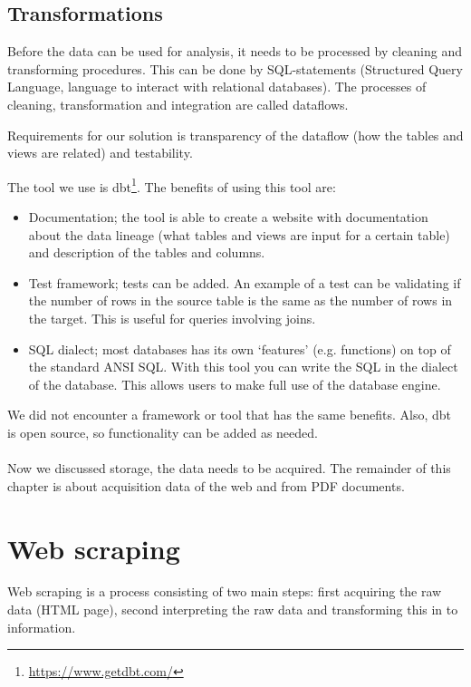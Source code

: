 \documentclass{ou-report}
\begin{document}
\subsection{Transformations}
\label{gen_impl:dbt}
Before the data can be used for analysis, it needs to be processed by cleaning
and transforming procedures. This can be done by SQL-statements (Structured Query 
Language, language to interact with relational databases). The processes of 
cleaning, transformation and integration are called dataflows.

Requirements for our solution is transparency of the dataflow (how the
tables and views are related) and testability.

The tool we use is dbt\footnote{\url{https://www.getdbt.com/}}. The benefits of
using this tool are:
\begin{itemize}
    \item Documentation; the tool is able to create a website with documentation
    about the data lineage (what tables and views are input for a certain table) 
    and description of the tables and columns.
    \item Test framework; tests can be added. An example of a test can be validating 
    if the number of rows in the source table is the same as the number of rows in the
    target. This is useful for queries involving joins.
    \item SQL dialect; most databases has its own `features' (e.g. functions) on 
    top of the standard ANSI SQL. With this tool you can write the SQL in the dialect of 
    the database. This allows users to make full use of the database engine.
\end{itemize}
We did not encounter a framework or tool that has the same benefits. Also, dbt
is open source, so functionality can be added as needed.

\paragraph{}
Now we discussed storage, the data needs to be acquired. The remainder of this 
chapter is about acquisition data of the web and from PDF documents.

\section{Web scraping}
\label{sec:web_scraping}
Web scraping is a process consisting of two main steps: first acquiring the raw 
data (HTML page), second interpreting the raw data and transforming this in to 
information.
\end{document}

